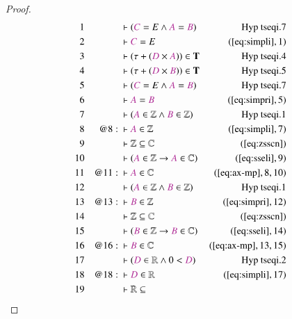 \begin{proof}
\begin{align}
  1 &&  & \vdash ( \mc{C} = E \wedge \mc{A} = \mc{B}
      )&\text{Hyp~tseqi.7}\notag%
  \\ 2 &&  & \vdash \mc{C} = E&(\mbox{\ref{eq:simpli}},1)\notag
  \\ 3 &&  & \vdash ( \tau + ( \mc{D} \times \mc{A} ) ) \in
      \mathbf{T}&\text{Hyp~tseqi.4}\notag%
  \\ 4 &&  & \vdash ( \tau + ( \mc{D} \times \mc{B} ) ) \in
      \mathbf{T}&\text{Hyp~tseqi.5}\notag%
  \\ 5 &&  & \vdash ( \mc{C} = E \wedge \mc{A} = \mc{B}
      )&\text{Hyp~tseqi.7}\notag%
  \\ 6 &&  & \vdash \mc{A} = \mc{B}&(\mbox{\ref{eq:simpri}},5)\notag
  \\ 7 &&  & \vdash ( \mc{A} \in \mathbb{Z} \wedge \mc{B} \in \mathbb{Z}
      )&\text{Hyp~tseqi.1}\notag%
  \\ 8 && @8:\  & \vdash \mc{A} \in \mathbb{Z}&(\mbox{\ref{eq:simpli}},7)\notag
  \\ 9 &&  & \vdash \mathbb{Z} \subseteq
      \mathbb{C}&(\mbox{\ref{eq:zsscn}})\notag
  \\ 10 &&  & \vdash ( \mc{A} \in \mathbb{Z} \rightarrow \mc{A} \in \mathbb{C}
      )&(\mbox{\ref{eq:sseli}},9)\notag
  \\ 11 && @11:\  & \vdash \mc{A} \in
      \mathbb{C}&(\mbox{\ref{eq:ax-mp}},8,10)\notag
  \\ 12 &&  & \vdash ( \mc{A} \in \mathbb{Z} \wedge \mc{B} \in \mathbb{Z}
      )&\text{Hyp~tseqi.1}\notag%
  \\ 13 && @13:\  & \vdash \mc{B} \in
      \mathbb{Z}&(\mbox{\ref{eq:simpri}},12)\notag
  \\ 14 &&  & \vdash \mathbb{Z} \subseteq
      \mathbb{C}&(\mbox{\ref{eq:zsscn}})\notag
  \\ 15 &&  & \vdash ( \mc{B} \in \mathbb{Z} \rightarrow \mc{B} \in \mathbb{C}
      )&(\mbox{\ref{eq:sseli}},14)\notag
  \\ 16 && @16:\  & \vdash \mc{B} \in
      \mathbb{C}&(\mbox{\ref{eq:ax-mp}},13,15)\notag
  \\ 17 &&  & \vdash ( \mc{D} \in \mathbb{R} \wedge 0 < \mc{D}
      )&\text{Hyp~tseqi.2}\notag%
  \\ 18 && @18:\  & \vdash \mc{D} \in
      \mathbb{R}&(\mbox{\ref{eq:simpli}},17)\notag
  \\ 19 &&  & \vdash \mathbb{R} \subseteq

\end{align}
\end{proof}
